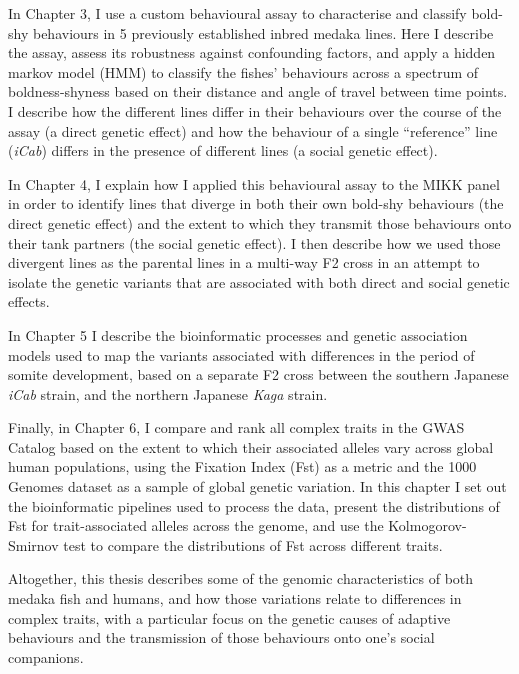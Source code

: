 \documentclass[
]{book}
\begin{document}
In Chapter 3, I use a custom behavioural assay to characterise and classify bold-shy behaviours in 5 previously established inbred medaka lines. Here I describe the assay, assess its robustness against confounding factors, and apply a hidden markov model (HMM) to classify the fishes' behaviours across a spectrum of boldness-shyness based on their distance and angle of travel between time points. I describe how the different lines differ in their behaviours over the course of the assay (a direct genetic effect) and how the behaviour of a single ``reference'' line (\emph{iCab}) differs in the presence of different lines (a social genetic effect).

In Chapter 4, I explain how I applied this behavioural assay to the MIKK panel in order to identify lines that diverge in both their own bold-shy behaviours (the direct genetic effect) and the extent to which they transmit those behaviours onto their tank partners (the social genetic effect). I then describe how we used those divergent lines as the parental lines in a multi-way F2 cross in an attempt to isolate the genetic variants that are associated with both direct and social genetic effects.

In Chapter 5 I describe the bioinformatic processes and genetic association models used to map the variants associated with differences in the period of somite development, based on a separate F2 cross between the southern Japanese \emph{iCab} strain, and the northern Japanese \emph{Kaga} strain.

Finally, in Chapter 6, I compare and rank all complex traits in the GWAS Catalog based on the extent to which their associated alleles vary across global human populations, using the Fixation Index (Fst) as a metric and the 1000 Genomes dataset as a sample of global genetic variation. In this chapter I set out the bioinformatic pipelines used to process the data, present the distributions of Fst for trait-associated alleles across the genome, and use the Kolmogorov-Smirnov test to compare the distributions of Fst across different traits.

Altogether, this thesis describes some of the genomic characteristics of both medaka fish and humans, and how those variations relate to differences in complex traits, with a particular focus on the genetic causes of adaptive behaviours and the transmission of those behaviours onto one's social companions.
\end{document}
